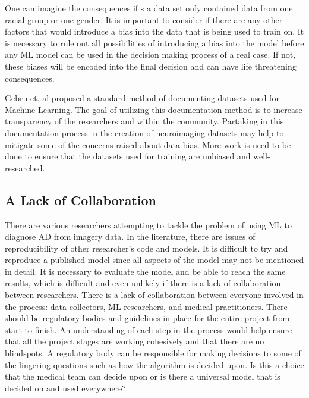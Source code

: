 \documentclass[10pt,twocolumn]{article}
\begin{document}
One can imagine the consequences if s a data set only contained data from one racial group or one gender. It is important to consider if there are any other factors that would introduce a bias into the data that is being used to train on. It is necessary to rule out all possibilities of introducing a bias into the model before any ML model can be used in the decision making process of a real case. If not, these biases will be encoded into the final decision and can have life threatening consequences.

Gebru et. al \cite{gebru2021datasheets} proposed a standard method of documenting datasets used for Machine Learning. The goal of utilizing this documentation method is to increase transparency of the researchers and within the community. Partaking in this documentation process in the creation of neuroimaging datasets may help to mitigate some of the concerns raised about data bias. More work is need to be done to ensure that the datasets used for training are unbiased and well-researched.  
\subsection{A Lack of Collaboration}
There are various researchers attempting to tackle the problem of using ML to diagnose AD from imagery data. In the literature, there are issues of reproducibility of other researcher’s code and models. It is difficult to try and reproduce a published model since all aspects of the model may not be mentioned in detail. It is necessary to evaluate the model and be able to reach the same results, which is difficult and even unlikely if there is a lack of collaboration between researchers. There is a lack of collaboration between everyone involved in the process: data collectors, ML researchers, and medical practitioners. There should be regulatory bodies and guidelines in place for the entire project from start to finish. An understanding of each step in the process would help ensure that all the project stages are working cohesively and that there are no blindspots. A regulatory body can be responsible for making decisions to some of the lingering questions such as how the algorithm is decided upon. Is this a choice that the medical team can decide upon or is there a universal model that is decided on and used everywhere? 
\end{document}
